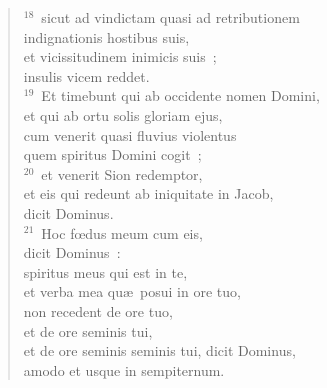\begin{verse}
${}^{18}$~sicut ad vindictam quasi ad retributionem\\ indignationis hostibus suis,\\ et vicissitudinem inimicis suis~;\\ insulis vicem reddet.\\
${}^{19}$~Et timebunt qui ab occidente nomen Domini,\\ et qui ab ortu solis gloriam ejus,\\ cum venerit quasi fluvius violentus\\ quem spiritus Domini cogit~;\\
${}^{20}$~et venerit Sion redemptor,\\ et eis qui redeunt ab iniquitate in Jacob,\\ dicit Dominus.\\
${}^{21}$~Hoc fœdus meum cum eis,\\ dicit Dominus~:\\ spiritus meus qui est in te,\\ et verba mea qu\ae\ posui in ore tuo,\\ non recedent de ore tuo,\\ et de ore seminis tui,\\ et de ore seminis seminis tui, dicit Dominus,\\ amodo et usque in sempiternum.\end{verse}


